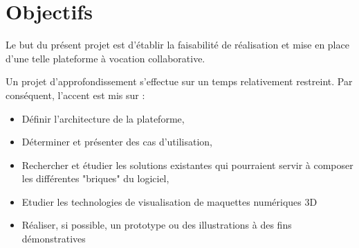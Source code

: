 \section{Objectifs}

Le but du présent projet est d'établir la faisabilité de réalisation et mise en place d'une telle plateforme à vocation collaborative.

Un projet d'approfondissement s'effectue sur un temps relativement restreint. Par conséquent, l'accent est mis sur :


\begin{itemize}
    \item Définir l'architecture de la plateforme,
    \item Déterminer et présenter des cas d'utilisation,
    \item Rechercher et étudier les solutions existantes qui pourraient servir à composer les différentes "briques" du logiciel,
    \item Etudier les technologies de visualisation de maquettes numériques 3D
    \item Réaliser, si possible, un prototype ou des illustrations à des fins démonstratives
\end{itemize}

